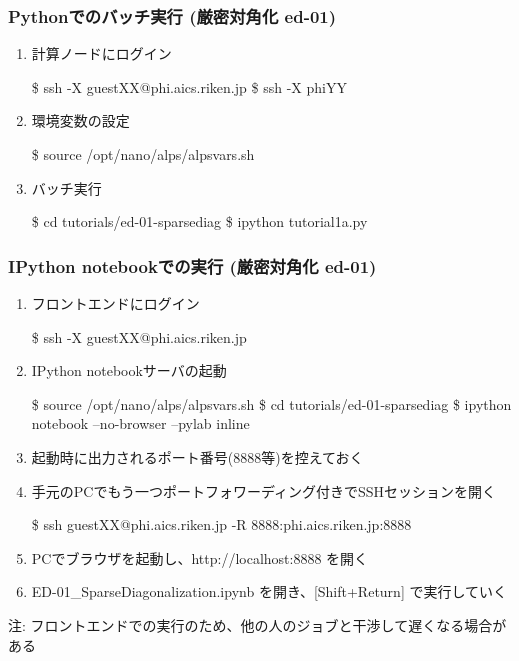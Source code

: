 \begin{frame}[fragile]
  \frametitle{Pythonでのバッチ実行 (厳密対角化 ed-01)}
  \begin{enumerate}
  \item<1-> 計算ノードにログイン
\begin{semiverbatim}
\$ ssh -X guest{\color{red}XX}@phi.aics.riken.jp
\$ ssh -X phi{\color{red}YY}
\end{semiverbatim}
  \item<1-> 環境変数の設定
\begin{semiverbatim}
\$ source /opt/nano/alps/alpsvars.sh
\end{semiverbatim}
  \item<1-> バッチ実行
\begin{semiverbatim}
\$ cd tutorials/ed-01-sparsediag
\$ ipython tutorial1a.py
\end{semiverbatim}
  \end{enumerate}
\end{frame}

\begin{frame}[fragile,shrink=10]
  \frametitle{IPython notebookでの実行 (厳密対角化 ed-01)}
  \begin{enumerate}
  \item<1-> フロントエンドにログイン
\begin{semiverbatim}
\$ ssh -X guest{\color{red}XX}@phi.aics.riken.jp
\end{semiverbatim}
  \item<1-> IPython notebookサーバの起動
\begin{semiverbatim}
\$ source /opt/nano/alps/alpsvars.sh
\$ cd tutorials/ed-01-sparsediag
\$ ipython notebook --no-browser --pylab inline
\end{semiverbatim}
  \item<1-> 起動時に出力されるポート番号(8888等)を控えておく
  \item<1-> 手元のPCでもう一つポートフォワーディング付きでSSHセッションを開く
\begin{semiverbatim}
\$ ssh guest{\color{red}XX}@phi.aics.riken.jp -R 8888:phi.aics.riken.jp:8888
\end{semiverbatim}
  \item<1-> PCでブラウザを起動し、http://localhost:8888 を開く
  \item<1-> ED-01\_SparseDiagonalization.ipynb を開き、[Shift+Return] で実行していく
  \end{enumerate}
  注: フロントエンドでの実行のため、他の人のジョブと干渉して遅くなる場合がある
\end{frame}

